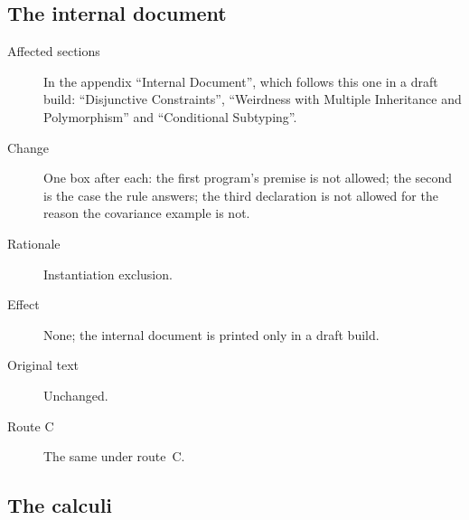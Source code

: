 \subsection{The internal document}

\begin{description}
\item[Affected sections] In the appendix ``Internal Document'', which
follows this one in a draft build: ``Disjunctive Constraints'',
``Weirdness with Multiple Inheritance and Polymorphism'' and
``Conditional Subtyping''.
\item[Change] One box after each: the first program's premise is not
allowed; the second is the case the rule answers; the third declaration is
not allowed for the reason the covariance example is not.
\item[Rationale] Instantiation exclusion.
\item[Effect] None; the internal document is printed only in a draft
build.
\item[Original text] Unchanged.
\item[Route C] The same under route~C.
\end{description}

\subsection{The calculi}

